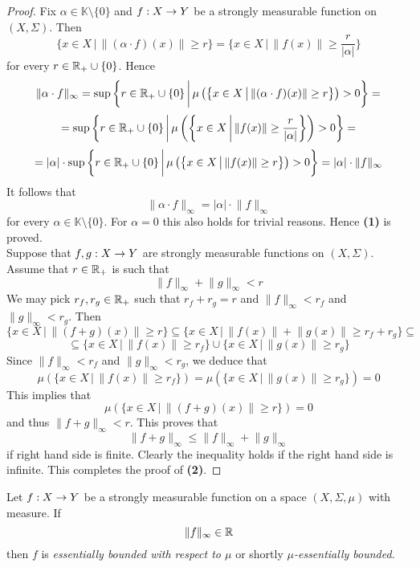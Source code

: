 \begin{proof}
Fix $\alpha \in \mathbb{K}\setminus \{0\}$ and $f:X\rightarrow Y$ be a strongly measurable function on $(X,\Sigma)$. Then
$$\{x\in X\,\big|\,\lVert (\alpha \cdot f)(x)\rVert \geq r\big\} = \bigg\{x\in X\,\bigg|\,\lVert f(x)\rVert \geq \frac{r}{|\alpha|}\bigg\}$$
for every $r \in {\mathbb R}_+\cup \{0\}$. Hence
$$\lVert \alpha \cdot f\rVert_{\infty} = \sup \bigg\{r\in {\mathbb R}_+\cup \{0\}\,\bigg|\,\mu\left(\big\{x\in X\,\big|\,\lVert (\alpha \cdot f)(x)\rVert \geq r\big\}\right) > 0\bigg\} =$$
$$= \sup \bigg\{r \in {\mathbb R}_+\cup \{0\}\,\bigg|\,\mu\left(\bigg\{x\in X\,\bigg|\,\lVert f(x)\rVert \geq \frac{r}{|\alpha|}\bigg\}\right) > 0\bigg\} = $$
$$= |\alpha| \cdot \sup \bigg\{r \in {\mathbb R}_+\cup \{0\}\,\bigg|\,\mu\left(\big\{x\in X\,\big|\,\lVert f(x)\rVert \geq r\big\}\right) > 0\bigg\} = |\alpha|\cdot \lVert f\rVert_{\infty}$$
It follows that
$$\lVert \alpha \cdot f\rVert_{\infty} = |\alpha|\cdot \lVert f\rVert_{\infty}$$
for every $\alpha \in \mathbb{K}\setminus \{0\}$. For $\alpha = 0$ this also holds for trivial reasons. Hence \textbf{(1)} is proved.\\
Suppose that $f,g:X\rightarrow Y$ are strongly measurable functions on $(X,\Sigma)$. Assume that $r\in {\mathbb R}_+$ is such that 
$$\lVert f \rVert_{\infty} + \lVert g \rVert_{\infty} < r$$
We may pick $r_f,r_g\in {\mathbb R}_+$ such that $r_f+r_g = r$ and $\lVert f \rVert_{\infty} < r_f$ and $\lVert g \rVert_{\infty} < r_g$. Then
$$\{x\in X\,\big|\,\lVert (f + g)(x)\rVert \geq r\big\} \subseteq \big\{x\in X\,\big|\,\lVert f(x)\rVert + \lVert g(x)\rVert \geq r_f + r_g\big\} \subseteq $$
$$\subseteq \big\{x\in X\,\big|\,\lVert f(x)\rVert  \geq r_f\big\} \cup \big\{x\in X\,\big|\,\lVert g(x)\rVert  \geq r_g\big\}$$
Since $\lVert f \rVert_{\infty} < r_f$ and $\lVert g \rVert_{\infty} < r_g$, we deduce that
$$\mu\left(\big\{x\in X\,\big|\,\lVert f(x)\rVert  \geq r_f\big\}\right) = \mu\left(\big\{x\in X\,\big|\,\lVert g(x)\rVert  \geq r_g\big\}\right) = 0$$
This implies that
$$\mu\left(\{x\in X\,\big|\,\lVert (f + g)(x)\rVert \geq r\big\}\right) = 0$$
and thus $\lVert f + g\rVert_{\infty} < r$. This proves that
$$\lVert f + g \rVert_{\infty} \leq \lVert f \rVert_{\infty} + \lVert g \rVert_{\infty}$$
if right hand side is finite. Clearly the inequality holds if the right hand side is infinite. This completes the proof of \textbf{(2)}.
\end{proof}

\begin{definition}
Let $f:X\rightarrow Y$ be a strongly measurable function on a space $(X,\Sigma,\mu)$ with measure. If
$$\lVert f \rVert_{\infty} \in {\mathbb R}$$
then $f$ is \textit{essentially bounded with respect to $\mu$} or shortly \textit{$\mu$-essentially bounded}.
\end{definition}


